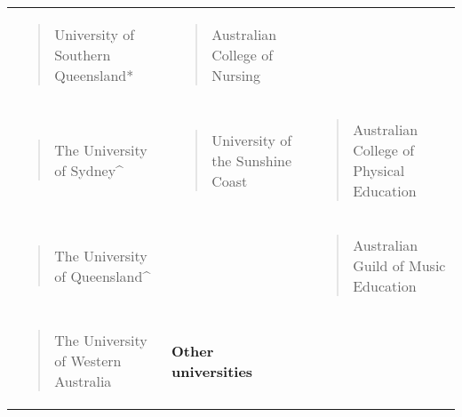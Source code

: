 \documentclass[]{book}
\begin{document}
\begin{longtable}[]{@{}lll@{}}
\begin{minipage}[t]{0.32\columnwidth}
\begin{quote}
University of Southern Queensland*
\end{quote}\strut
\end{minipage} & \begin{minipage}[t]{0.32\columnwidth}\raggedright
\begin{quote}
Australian College of Nursing
\end{quote}\strut
\end{minipage}\tabularnewline
\begin{minipage}[t]{0.32\columnwidth}\raggedright
\begin{quote}
The University of Sydney\^{}
\end{quote}\strut
\end{minipage} & \begin{minipage}[t]{0.32\columnwidth}\raggedright
\begin{quote}
University of the Sunshine Coast
\end{quote}\strut
\end{minipage} & \begin{minipage}[t]{0.32\columnwidth}\raggedright
\begin{quote}
Australian College of Physical Education
\end{quote}\strut
\end{minipage}\tabularnewline
\begin{minipage}[t]{0.32\columnwidth}\raggedright
\begin{quote}
The University of Queensland\^{}
\end{quote}\strut
\end{minipage} & \begin{minipage}[t]{0.32\columnwidth}\raggedright
\strut
\end{minipage} & \begin{minipage}[t]{0.32\columnwidth}\raggedright
\begin{quote}
Australian Guild of Music Education
\end{quote}\strut
\end{minipage}\tabularnewline
\begin{minipage}[t]{0.32\columnwidth}\raggedright
\begin{quote}
The University of Western Australia
\end{quote}\strut
\end{minipage} & \begin{minipage}[t]{0.32\columnwidth}\raggedright
\textbf{Other universities}\strut
\end{minipage} & \begin{minipage}[t]{0.32\columnwidth}\raggedright

\end{minipage}
\end{longtable}
\end{document}
